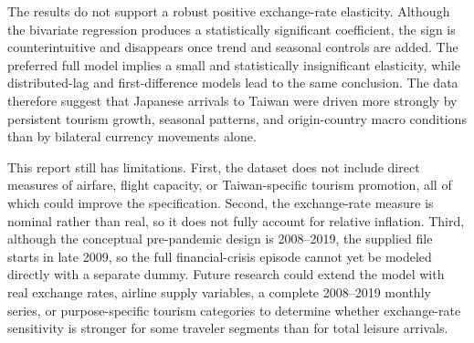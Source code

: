 \documentclass[12pt,a4paper]{article}
\begin{document}
The results do not support a robust positive exchange-rate elasticity. Although the bivariate regression produces a statistically significant coefficient, the sign is counterintuitive and disappears once trend and seasonal controls are added. The preferred full model implies a small and statistically insignificant elasticity, while distributed-lag and first-difference models lead to the same conclusion. The data therefore suggest that Japanese arrivals to Taiwan were driven more strongly by persistent tourism growth, seasonal patterns, and origin-country macro conditions than by bilateral currency movements alone.

This report still has limitations. First, the dataset does not include direct measures of airfare, flight capacity, or Taiwan-specific tourism promotion, all of which could improve the specification. Second, the exchange-rate measure is nominal rather than real, so it does not fully account for relative inflation. Third, although the conceptual pre-pandemic design is 2008--2019, the supplied file starts in late 2009, so the full financial-crisis episode cannot yet be modeled directly with a separate dummy. Future research could extend the model with real exchange rates, airline supply variables, a complete 2008--2019 monthly series, or purpose-specific tourism categories to determine whether exchange-rate sensitivity is stronger for some traveler segments than for total leisure arrivals.
\end{document}
